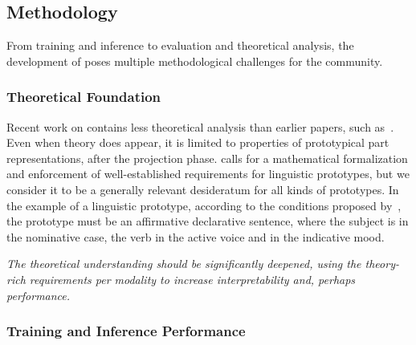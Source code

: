 \subsection{\texorpdfstring{\colorbox[RGB]{58,142,237}{Methodology}}{Methodology}}
\label{ssec:chall:method}
From training and inference to evaluation and theoretical analysis, the development of \ppms poses multiple methodological challenges for the community.

\subsubsection{\texorpdfstring{\colorbox[RGB]{156,198,246}{Theoretical Foundation}}{Theoretical Foundation}}
\label{sssec:chall:method:tf}
Recent work on \ppms contains less theoretical analysis than earlier papers, such as~\citep{Chen_2019_ThisLooksThat}. Even when theory does appear, it is limited to properties of prototypical part representations, after the projection phase.
\citet{Hong_2023_ProtoryNetInterpretableText} calls for a mathematical formalization and enforcement of well-established requirements for linguistic prototypes, but we consider it to be a generally relevant desideratum for all kinds of prototypes. In the example of a linguistic prototype, according to the conditions proposed by~\citet{panther2008prototype}, the prototype must be an affirmative declarative sentence, where the subject is in the nominative case, the verb in the active voice and in the indicative mood.

\textit{The theoretical understanding  should be significantly deepened, using the theory-rich requirements per modality to increase interpretability and, perhaps performance.}

\subsubsection{Training and Inference \texorpdfstring{\colorbox[RGB]{156,198,246}{Performance}}{Performance}}
\label{sssec:chall:method:perf}

